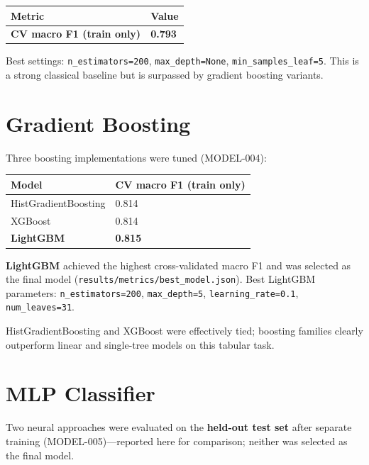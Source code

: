 ﻿\documentclass[11pt,a4paper]{article}
\begin{document}
\begin{table}[H]
  \centering
  \small
  \begin{tabular}{ll}
    \toprule
    Metric & Value \\
    \midrule
    \textbf{CV macro F1 (train only)} & \textbf{0.793} \\
    \bottomrule
  \end{tabular}
\end{table}

Best settings: \texttt{n\_estimators=200}, \texttt{max\_depth=None}, \texttt{min\_samples\_leaf=5}. This is a strong classical baseline but is surpassed by gradient boosting variants.


\section{Gradient Boosting}

Three boosting implementations were tuned (MODEL-004):

\begin{table}[H]
  \centering
  \small
  \begin{tabular}{ll}
    \toprule
    Model & CV macro F1 (train only) \\
    \midrule
    HistGradientBoosting & 0.814 \\
    XGBoost & 0.814 \\
    \textbf{LightGBM} & \textbf{0.815} \\
    \bottomrule
  \end{tabular}
\end{table}

\textbf{LightGBM} achieved the highest cross-validated macro F1 and was selected as the final model (\texttt{results/metrics/best\_model.json}). Best LightGBM parameters: \texttt{n\_estimators=200}, \texttt{max\_depth=5}, \texttt{learning\_rate=0.1}, \texttt{num\_leaves=31}.

HistGradientBoosting and XGBoost were effectively tied; boosting families clearly outperform linear and single-tree models on this tabular task.


\section{MLP Classifier}

Two neural approaches were evaluated on the \textbf{held-out test set} after separate training (MODEL-005)—reported here for comparison; neither was selected as the final model.
\end{document}
